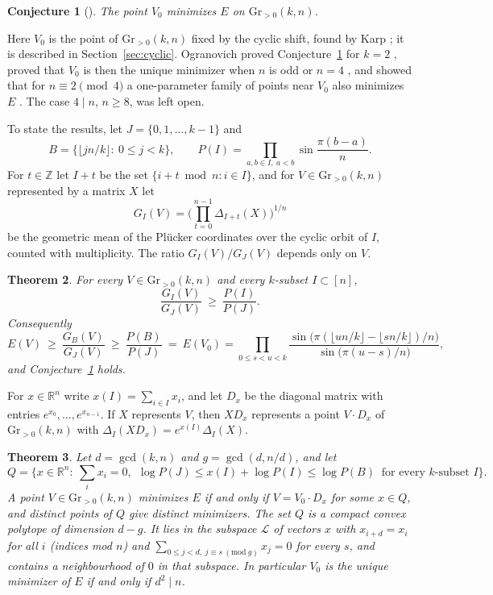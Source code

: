 \documentclass[11pt]{article}
\newtheorem{theorem}{Theorem}
\newtheorem{conjecture}[theorem]{Conjecture}
\theoremstyle{remark}
\newcommand{\Gr}{\mathrm{Gr}}
\newcommand{\Z}{\mathbb{Z}}
\newcommand{\R}{\mathbb{R}}
\begin{document}
\begin{conjecture}[{\cite[Conjecture~1.2]{O}}]\label{conj:O}
The point $V_0$ minimizes $E$ on $\Gr_{>0}(k,n)$.
\end{conjecture}

Here $V_0$ is the point of $\Gr_{>0}(k,n)$ fixed by the cyclic shift, found by Karp \cite{K}; it is described in Section~\ref{sec:cyclic}. Ogranovich proved Conjecture~\ref{conj:O} for $k=2$ \cite[Theorem~3.1]{O}, proved that $V_0$ is then the unique minimizer when $n$ is odd or $n=4$ \cite[Propositions~3.2 and~3.5]{O}, and showed that for $n\equiv2\pmod 4$ a one-parameter family of points near $V_0$ also minimizes $E$ \cite[Proposition~3.6]{O}. The case $4\mid n$, $n\ge8$, was left open.

To state the results, let $J=\{0,1,\dots,k-1\}$ and
\[
B=\{\lfloor jn/k\rfloor:\ 0\le j<k\},\qquad P(I)=\prod_{a,b\in I,\ a<b}\sin\frac{\pi(b-a)}{n}.
\]
For $t\in\Z$ let $I+t$ be the set $\{i+t \bmod n: i\in I\}$, and for $V\in\Gr_{>0}(k,n)$ represented by a matrix $X$ let
\[
G_I(V)=\Big(\prod_{t=0}^{n-1}\Delta_{I+t}(X)\Big)^{1/n}
\]
be the geometric mean of the Pl\"ucker coordinates over the cyclic orbit of $I$, counted with multiplicity. The ratio $G_I(V)/G_J(V)$ depends only on $V$.

\begin{theorem}\label{thm:main}
For every $V\in\Gr_{>0}(k,n)$ and every $k$-subset $I\subset[n]$,
\begin{equation}\label{eq:orbit}
\frac{G_I(V)}{G_J(V)}\ \ge\ \frac{P(I)}{P(J)} .
\end{equation}
Consequently
\begin{equation}\label{eq:value}
E(V)\ \ge\ \frac{G_B(V)}{G_J(V)}\ \ge\ \frac{P(B)}{P(J)}\ =\ E(V_0)
=\prod_{0\le s<u<k}\frac{\sin\big(\pi(\lfloor un/k\rfloor-\lfloor sn/k\rfloor)/n\big)}{\sin\big(\pi(u-s)/n\big)} ,
\end{equation}
and Conjecture~\ref{conj:O} holds.
\end{theorem}

For $x\in\R^n$ write $x(I)=\sum_{i\in I}x_i$, and let $D_x$ be the diagonal matrix with entries $e^{x_0},\dots,e^{x_{n-1}}$. If $X$ represents $V$, then $XD_x$ represents a point $V\cdot D_x$ of $\Gr_{>0}(k,n)$ with $\Delta_I(XD_x)=e^{x(I)}\Delta_I(X)$.

\begin{theorem}\label{thm:class}
Let $d=\gcd(k,n)$ and $g=\gcd(d,n/d)$, and let
\[
Q=\Big\{x\in\R^n:\ \sum_i x_i=0,\ \ \log P(J)\le x(I)+\log P(I)\le\log P(B)\ \text{ for every $k$-subset } I\Big\}.
\]
A point $V\in\Gr_{>0}(k,n)$ minimizes $E$ if and only if $V=V_0\cdot D_x$ for some $x\in Q$, and distinct points of $Q$ give distinct minimizers. The set $Q$ is a compact convex polytope of dimension $d-g$. It lies in the subspace $\mathcal{L}$ of vectors $x$ with $x_{i+d}=x_i$ for all $i$ (indices mod $n$) and $\sum_{0\le j<d,\ j\equiv s\ (\mathrm{mod}\ g)}x_j=0$ for every $s$, and contains a neighbourhood of $0$ in that subspace. In particular $V_0$ is the unique minimizer of $E$ if and only if $d^2\mid n$.
\end{theorem}
\end{document}
